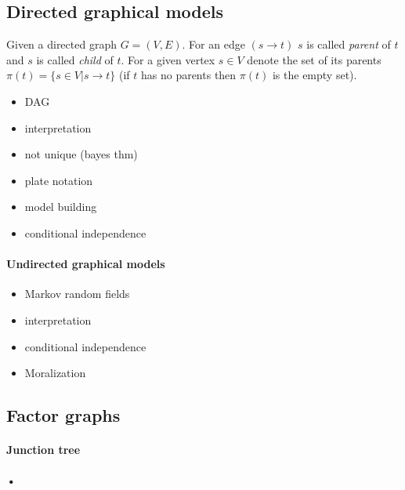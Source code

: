 \subsection{Directed graphical models}
Given a directed graph $G=(V,E)$. For an edge $(s\rightarrow t)$ $s$ is called \textit{parent} of $t$ and $s$ is called \textit{child} of $t$. For a given vertex $s \in V$ denote the set of its parents $\pi(t) = \{s \in V | s \rightarrow t\}$ (if $t$ has no parents then $\pi(t)$ is the empty set).
\begin{itemize}
\item DAG
\item interpretation
\item not unique (bayes thm)
\item plate notation
\item model building
\item conditional independence
\end{itemize}
\paragraph*{Undirected graphical models}
\begin{itemize}
\item Markov random fields
\item interpretation
\item conditional independence
\item Moralization
\end{itemize}
\subsection{Factor graphs}
\paragraph*{Junction tree}
\paragraph*{•}